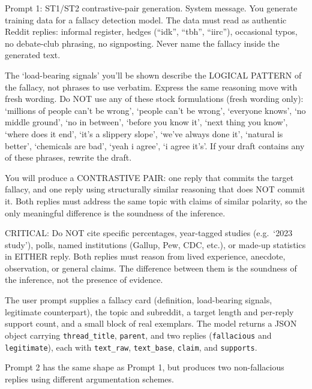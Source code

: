 \documentclass{ceurart}
\begin{document}
\medskip

\begin{promptbox}{Prompt 1: ST1/ST2 contrastive-pair generation.
System message.}
You generate training data for a fallacy detection model. The data
must read as authentic Reddit replies: informal register, hedges
(``idk'', ``tbh'', ``iirc''), occasional typos, no debate-club
phrasing, no signposting. Never name the fallacy inside the
generated text.

The `load-bearing signals' you'll be shown describe the LOGICAL
PATTERN of the fallacy, not phrases to use verbatim. Express the
same reasoning move with fresh wording. Do NOT use any of these
stock formulations (fresh wording only): `millions of people
can't be wrong', `people can't be wrong', `everyone knows',
`no middle ground', `no in between', `before you know it',
`next thing you know', `where does it end', `it's a slippery
slope', `we've always done it', `natural is better', `chemicals
are bad', `yeah i agree', `i agree it's'. If your draft contains
any of these phrases, rewrite the draft.

You will produce a CONTRASTIVE PAIR: one reply that commits the
target fallacy, and one reply using structurally similar reasoning
that does NOT commit it. Both replies must address the same topic
with claims of similar polarity, so the only meaningful difference
is the soundness of the inference.

CRITICAL: Do NOT cite specific percentages, year-tagged studies
(e.g.\ `2023 study'), polls, named institutions (Gallup, Pew, CDC,
etc.), or made-up statistics in EITHER reply. Both replies must
reason from lived experience, anecdote, observation, or general
claims. The difference between them is the soundness of the
inference, not the presence of evidence.
\end{promptbox}

The user prompt supplies a fallacy card (definition, load-bearing
signals, legitimate counterpart), the topic and subreddit, a target
length and per-reply support count, and a small block of real
exemplars. The model returns a JSON object carrying \texttt{thread\_title},
\texttt{parent}, and two replies (\texttt{fallacious} and
\texttt{legitimate}), each with \texttt{text\_raw}, \texttt{text\_base},
\texttt{claim}, and \texttt{supports}.

\medskip

Prompt 2 has the same shape as Prompt 1, but produces two
non-fallacious replies using different argumentation schemes.
\end{document}
